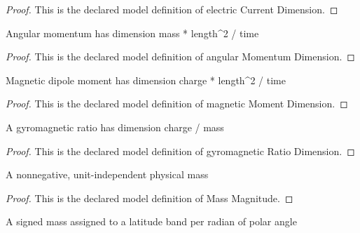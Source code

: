 \begin{proof}
  This is the declared model definition of electric Current Dimension.
\end{proof}
\begin{definition}
  \label{def:physics:phyx-mini-0970:phyxminiproblems-problemphyxmini0970-angularmomentumdimension}
  Angular momentum has dimension mass * length\textasciicircum{}2 / time
\end{definition}
\begin{proof}
  This is the declared model definition of angular Momentum Dimension.
\end{proof}
\begin{definition}
  \label{def:physics:phyx-mini-0970:phyxminiproblems-problemphyxmini0970-magneticmomentdimension}
  Magnetic dipole moment has dimension charge * length\textasciicircum{}2 / time
\end{definition}
\begin{proof}
  This is the declared model definition of magnetic Moment Dimension.
\end{proof}
\begin{definition}
  \label{def:physics:phyx-mini-0970:phyxminiproblems-problemphyxmini0970-gyromagneticratiodimension}
  A gyromagnetic ratio has dimension charge / mass
\end{definition}
\begin{proof}
  This is the declared model definition of gyromagnetic Ratio Dimension.
\end{proof}
\begin{definition}
  \label{def:physics:phyx-mini-0970:phyxminiproblems-problemphyxmini0970-massmagnitude}
  A nonnegative, unit-independent physical mass
\end{definition}
\begin{proof}
  This is the declared model definition of Mass Magnitude.
\end{proof}
\begin{definition}
  \label{def:physics:phyx-mini-0970:phyxminiproblems-problemphyxmini0970-latitudebandmassdensity}
  A signed mass assigned to a latitude band per radian of polar angle
\end{definition}
